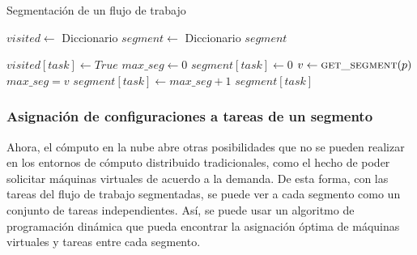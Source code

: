 \begin{algorithm}
\caption{Segmentación de un flujo de trabajo}
\label{alg_blind_segments}
\begin{algorithmic}[1]
	\State $visited \gets$ Diccionario
	\State $segment \gets$ Diccionario
		\State {}
	\EndFor
	\State \Return $segment$
\EndProcedure

	\State $visited[task] \gets True$
	\State $max\_seg \gets 0$
		\State $segment[task] \gets 0$
			\State $v \gets \Call{get\_segment}{p}$
				\State $max\_seg = v$
			\EndIf
		\EndFor
		\State $segment[task] \gets max\_seg + 1$
	\EndIf
	\State \Return $segment[task]$
\EndProcedure



		\Else
		\EndIf
	\EndFor
\EndProcedure	
\end{algorithmic}
\end{algorithm}

\subsubsection{Asignación de configuraciones a tareas de un segmento}

Ahora, el cómputo en la nube abre otras posibilidades que no se pueden realizar en los entornos de cómputo distribuido tradicionales, como el hecho de poder solicitar máquinas virtuales de acuerdo a la demanda. De esta forma, con las tareas del flujo de trabajo segmentadas, se puede ver a cada segmento como un conjunto de tareas independientes. Así, se puede usar un algoritmo de programación dinámica que pueda encontrar la asignación óptima de máquinas virtuales y tareas entre cada segmento.

